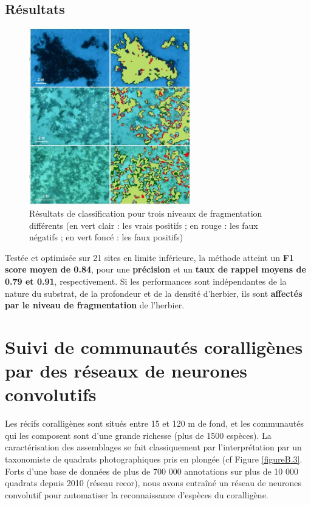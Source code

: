 \subsection*{Résultats}
\begin{figure} 
	\includegraphics[width=7cm]{images/appendix_merigeo/Figure2.jpg}
		\caption[Résultats de classification pour trois niveaux de fragmentation différents]{Résultats de classification pour trois niveaux de fragmentation différents (en vert clair : les vrais positifs ; en rouge : les faux négatifs ; en vert foncé : les faux positifs)}
	\label{figureB.2}
\end{figure}
Testée et optimisée sur 21 sites en limite inférieure, la méthode atteint un \textbf{F1 score moyen de 0.84}, pour une \textbf{précision} et un \textbf{taux de rappel moyens de 0.79 et 0.91}, respectivement. Si les performances sont indépendantes de la nature du substrat, de la profondeur et de la densité d’herbier, ils sont \textbf{affectés par le niveau de fragmentation} de l’herbier. 


\bigskip

\section*{Suivi de communautés coralligènes par des réseaux de neurones convolutifs}

Les récifs coralligènes sont situés entre 15 et 120 m de fond, et les communautés qui les composent sont d’une grande richesse (plus de 1500 espèces). La caractérisation des assemblages se fait classiquement par l’interprétation par un taxonomiste de quadrats photographiques pris en plongée (cf Figure \ref{figureB.3}. Forts d’une base de données de plus de 700 000 annotations sur plus de 10 000 quadrats depuis 2010 (réseau \acrshort{recor}), nous avons entraîné un réseau de neurones convolutif pour automatiser la reconnaissance d’espèces du coralligène.




